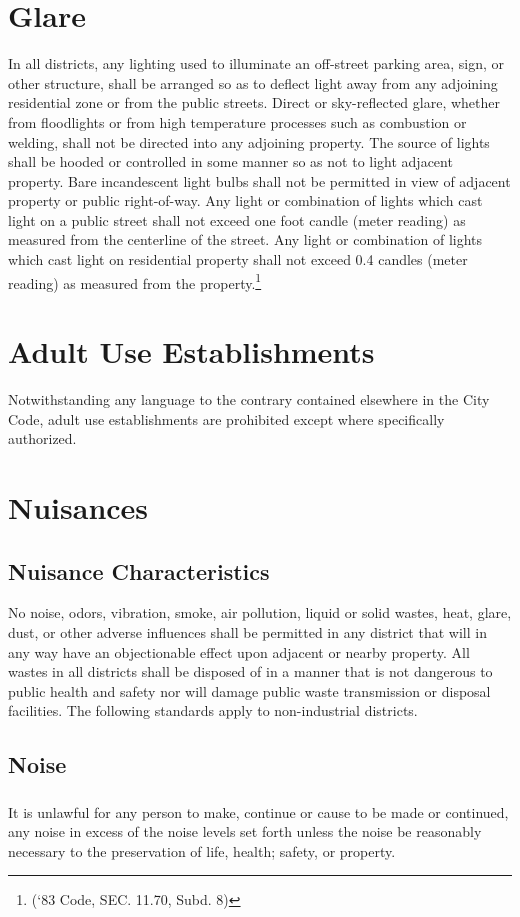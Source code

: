 \section{Glare}
In all districts, any lighting used to illuminate an off-street parking area, sign, or other structure, shall be arranged so as to deflect light away from any adjoining residential zone or from the public streets. Direct or sky-reflected glare, whether from floodlights or from high temperature processes such as combustion or welding, shall not be directed into any adjoining property. The source of lights shall be hooded or controlled in some manner so as not to light adjacent property. Bare incandescent light bulbs shall not be permitted in view of adjacent property or public right-of-way.  Any light or combination of lights which cast light on a public street shall not exceed one foot candle (meter reading) as measured from the centerline of the street. Any light or combination of lights which cast light on residential property shall not exceed 0.4 candles (meter reading) as measured from the property.\footnote{(‘83 Code, SEC. 11.70, Subd. 8)}
\section{Adult Use Establishments}
Notwithstanding any language to the contrary contained elsewhere in the City Code, adult use establishments are prohibited except where specifically authorized.
\section{Nuisances}
\subsection{Nuisance Characteristics}
No noise, odors, vibration, smoke, air pollution, liquid or solid wastes, heat, glare, dust, or other adverse influences shall be permitted in any district that will in any way have an objectionable effect upon adjacent or nearby property. All wastes in all districts shall be disposed of in a manner that is not dangerous to public health and safety nor will damage public waste transmission or disposal facilities. The following standards apply to non-industrial districts.
\subsection{Noise}
\subsubsection{}
It is unlawful for any person to make, continue or cause to be made or continued, any noise in excess of the noise levels set forth unless the noise be reasonably necessary to the preservation of life, health; safety, or property.
